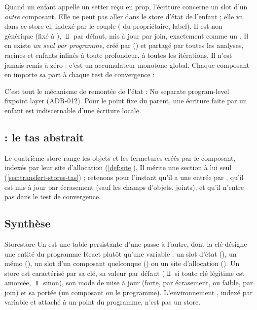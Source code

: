 Quand un enfant appelle un setter reçu en prop, l'écriture concerne un slot
d'un \emph{autre} composant. Elle ne peut pas aller dans le store d'état de
l'enfant ; elle va dans ce store-ci, indexé par le couple
( du propriétaire, label). Il est non générique (fixé à
), $\Bot$ par défaut, mis à jour par join, exactement comme
un . Il en existe \emph{un seul par programme}, créé par
 () et partagé par
toutes les analyses, racines et enfants inlinés à toute profondeur, à toutes
les itérations. Il n'est jamais remis à zéro : c'est un accumulateur monotone
global. Chaque composant en importe sa part à chaque test de convergence :


C'est tout le mécanisme de remontée de l'état : \og No separate
program-level fixpoint layer\fg{} (ADR-012). Pour le point fixe du parent,
une écriture faite par un enfant est indiscernable d'une écriture locale.

\subsection{ : le tas abstrait}

Le quatrième store range les objets et les fermetures créés par le
composant, indexés par leur site d'allocation (\cref{def:site}). Il mérite
une section à lui seul (\cref{sec:transfert-stores-tas}) ; retenons pour
l'instant qu'il a une entrée par , qu'il est mis à jour par
écrasement (sauf les champs d'objets, joints), et qu'il n'entre pas dans le
test de convergence.

\subsection{Synthèse}

\begin{definition}{Store}{store}
  Un  est une table persistante d'une passe à l'autre, dont la
  clé désigne une entité du programme React plutôt qu'une variable : un slot
  d'état (), un mémo (), un slot d'un
  composant quelconque () ou un site d'allocation
  (). Un store est caractérisé par sa clé, sa valeur par défaut
  ($\Bot$ si toute clé légitime est amorcée, $\Top$ sinon), son mode de mise
  à jour (forte, par écrasement, ou faible, par join) et sa portée (un
  composant ou le programme). L'environnement , indexé par
  variable et attaché à un point du programme, n'est pas un store.
\end{definition}

